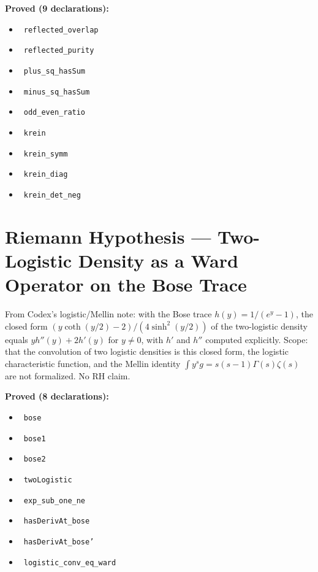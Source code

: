 \documentclass{report}
\theoremstyle{definition}
\begin{document}
\noindent\textbf{Proved (9 declarations):}
\begin{itemize}
  \item {}\leanok\ \texttt{reflected\_overlap}
  \item {}\leanok\ \texttt{reflected\_purity}
  \item {}\leanok\ \texttt{plus\_sq\_hasSum}
  \item {}\leanok\ \texttt{minus\_sq\_hasSum}
  \item {}\leanok\ \texttt{odd\_even\_ratio}
  \item {}\leanok\ \texttt{krein}
  \item {}\leanok\ \texttt{krein\_symm}
  \item {}\leanok\ \texttt{krein\_diag}
  \item {}\leanok\ \texttt{krein\_det\_neg}
\end{itemize}

\section{Riemann Hypothesis --- Two-Logistic Density as a Ward Operator on the Bose Trace}
From Codex's logistic/Mellin note: with the Bose trace $h(y)=1/(e^y-1)$, the closed form $(y\coth(y/2)-2)/(4\sinh^2(y/2))$ of the two-logistic density equals $yh''(y)+2h'(y)$ for $y\ne0$, with $h'$ and $h''$ computed explicitly. Scope: that the convolution of two logistic densities is this closed form, the logistic characteristic function, and the Mellin identity $\int y^sg=s(s-1)\Gamma(s)\zeta(s)$ are not formalized. No RH claim.

\noindent\textbf{Proved (8 declarations):}
\begin{itemize}
  \item {}\leanok\ \texttt{bose}
  \item {}\leanok\ \texttt{bose1}
  \item {}\leanok\ \texttt{bose2}
  \item {}\leanok\ \texttt{twoLogistic}
  \item {}\leanok\ \texttt{exp\_sub\_one\_ne}
  \item {}\leanok\ \texttt{hasDerivAt\_bose}
  \item {}\leanok\ \texttt{hasDerivAt\_bose'}
  \item {}\leanok\ \texttt{logistic\_conv\_eq\_ward}
\end{itemize}
\end{document}
